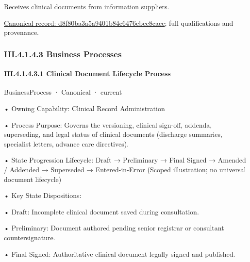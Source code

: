 Receives clinical documents from information suppliers.


{\footnotesize \href{../../../../../../../continuum/business/business-function/d8f80ba3a5a9401b84e6476cbec8cace.md}{Canonical record: d8f80ba3a5a9401b84e6476cbec8cace}; full qualifications and provenance.}\par
\subsubsection*{III.4.1.4.3 Business Processes}
\label{navigation:III.4.1.4.3}

\paragraph*{III.4.1.4.3.1 Clinical Document Lifecycle Process}
\label{navigation:III.4.1.4.3.1}

\label{element:eacdec16b96844b4963b8a960d1a8666}
{\small BusinessProcess · Canonical · current}\par

•
Owning Capability: Clinical Record Administration



•
Process Purpose: Governs the versioning, clinical sign-off, addenda, superseding, and legal status of clinical documents (discharge summaries, specialist letters, advance care directives).



•
State Progression Lifecycle: Draft → Preliminary → Final Signed → Amended / Addended → Superseded → Entered-in-Error   (Scoped illustration; no universal document lifecycle)



•
Key State Dispositions:



•
Draft: Incomplete clinical document saved during consultation.



•
Preliminary: Document authored pending senior registrar or consultant countersignature.



•
Final Signed: Authoritative clinical document legally signed and published.



